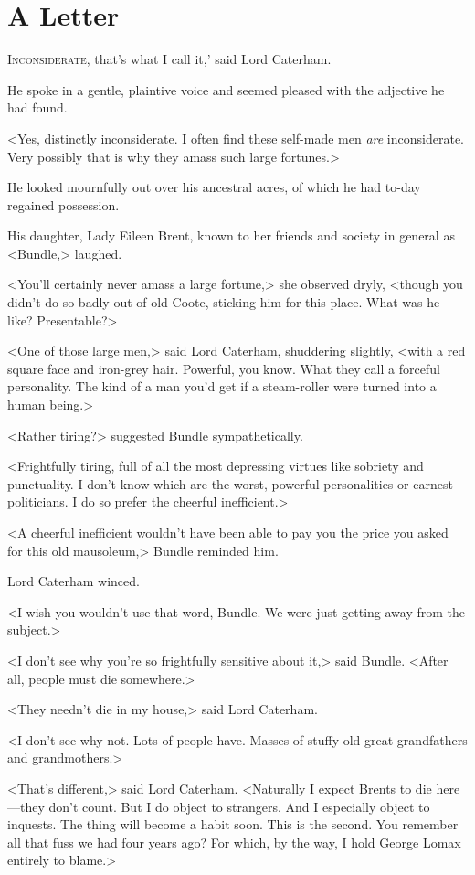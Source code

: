 \chapter{A Letter}

\lettrine[ante=`]{I}{nconsiderate,}  that's what I call it,' said Lord Caterham.

\zz
He spoke in a gentle, plaintive voice and seemed pleased with the adjective he had found.

\zz
<Yes, distinctly inconsiderate. I often find these self-made men \emph{are} inconsiderate. Very possibly that is why they amass such large fortunes.>

He looked mournfully out over his ancestral acres, of which he had to-day regained possession.

His daughter, Lady Eileen Brent, known to her friends and society in general as <Bundle,> laughed.

<You'll certainly never amass a large fortune,> she observed dryly, <though you didn't do so badly out of old Coote, sticking him for this place. What was he like? Presentable?>

<One of those large men,> said Lord Caterham, shuddering slightly, <with a red square face and iron-grey hair. Powerful, you know. What they call a forceful personality. The kind of a man you'd get if a steam-roller were turned into a human being.>

<Rather tiring?> suggested Bundle sympathetically.

<Frightfully tiring, full of all the most depressing virtues like sobriety and punctuality. I don't know which are the worst, powerful personalities or earnest politicians. I do so prefer the cheerful inefficient.>

<A cheerful inefficient wouldn't have been able to pay you the price you asked for this old mausoleum,> Bundle reminded him.

Lord Caterham winced.

<I wish you wouldn't use that word, Bundle. We were just getting away from the subject.>

<I don't see why you're so frightfully sensitive about it,> said Bundle. <After all, people must die somewhere.>

<They needn't die in my house,> said Lord Caterham.

<I don't see why not. Lots of people have. Masses of stuffy old great grandfathers and grandmothers.>

<That's different,> said Lord Caterham. <Naturally I expect Brents to die here—they don't count. But I do object to strangers. And I especially object to inquests. The thing will become a habit soon. This is the second. You remember all that fuss we had four years ago? For which, by the way, I hold George Lomax entirely to blame.>

